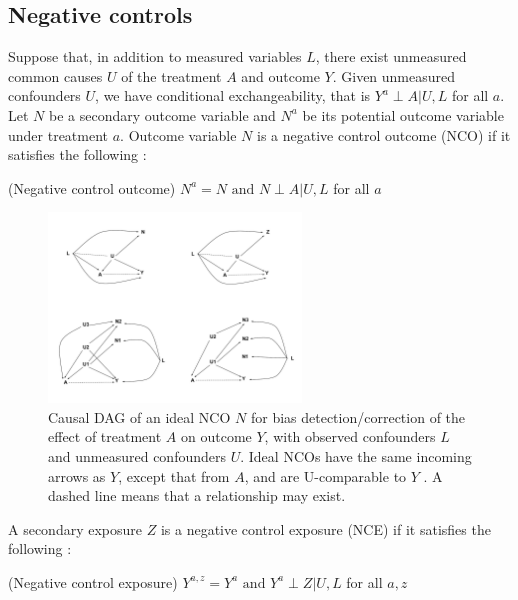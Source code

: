 \subsection{Negative controls}

Suppose that, in addition to measured variables $L$, there exist unmeasured common causes $U$ of the treatment $A$ and outcome $Y$. Given unmeasured confounders $U$, we have conditional exchangeability, that is $Y^a \perp A | U, L$ for all $a$. Let $N$ be a secondary outcome variable and $N^a$ be its potential outcome variable under treatment $a$. Outcome variable $N$ is a negative control outcome (NCO) if it satisfies the following \cite{shi2020selective}:

\begin{assumption} (Negative control outcome) \label{as:nco}
  $N^a = N \text{ and } N \perp A | U, L$ for all $a$
\end{assumption}

\begin{figure}[ht]
    \centering
    \includegraphics[trim={0 11cm 13cm 1.5cm}, clip, width=0.6\textwidth]{figures/dags.pdf}
    \caption[Causal DAG of an ideal NCO $N$ for bias detection/correction of the effect of treatment $A$ on outcome $Y$.]{Causal DAG of an ideal NCO $N$ for bias detection/correction of the effect of treatment $A$ on outcome $Y$, with observed confounders $L$ and unmeasured confounders $U$. Ideal NCOs have the same incoming arrows as $Y$, except that from $A$, and are U-comparable to $Y$ \cite{lipsitch2010negative}. A dashed line means that a relationship may exist.}
    \label{fig:nco-nco-dag}
\end{figure}

A secondary exposure $Z$ is a negative control exposure (NCE) if it satisfies the following \cite{shi2020selective}:

\begin{assumption} (Negative control exposure) \label{as:nce}
  $Y^{a,z} = Y^a \text{ and } Y^a \perp Z | U, L$ for all $a, z$
\end{assumption}

